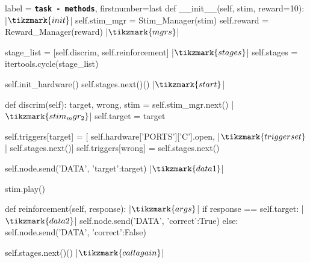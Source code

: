 \begin{pythoncode*}{label = \texttt{\textbf{task - methods}}, firstnumber=last}
    def __init__(self, stim, reward=10): |$\tikzmark{init}$|
        self.stim_mgr = Stim_Manager(stim)
        self.reward   = Reward_Manager(reward) |$\tikzmark{mgrs}$|

        stage_list  = [self.discrim, self.reinforcement] |$\tikzmark{stages}$|
        self.stages = itertools.cycle(stage_list)

        self.init_hardware()
        self.stages.next()() |$\tikzmark{start}$|

    def discrim(self):
        target, wrong, stim = self.stim_mgr.next() |$\tikzmark{stim_mgr_2}$|
        self.target = target

        self.triggers[target] = [
            self.hardware['PORTS']['C'].open, |$\tikzmark{triggerset}$|
            self.stages.next()]
        self.triggers[wrong] = self.stages.next()

        self.node.send('DATA', {'target':target}) |$\tikzmark{data1}$|

        stim.play()

    def reinforcement(self, response): |$\tikzmark{args}$|
        if response == self.target: |$\tikzmark{data2}$|
            self.node.send('DATA', {'correct':True})
        else:
            self.node.send('DATA', {'correct':False})

        self.stages.next()() |$\tikzmark{callagain}$|
\end{pythoncode*}

